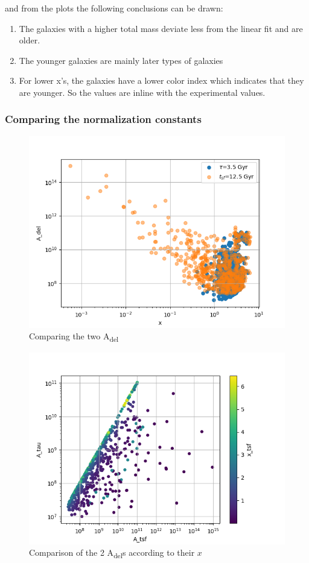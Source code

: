 \documentclass[a4paper,twocolumn]{article}
\begin{document}
and from the plots the following conclusions can be drawn:

\begin{enumerate}
\item The galaxies with a higher total mass deviate less from the linear fit and are older.
\item The younger galaxies are mainly later types of galaxies
\item For lower x's, the galaxies have a lower color index which indicates that they are younger. So the values are inline with the experimental values.
\end{enumerate}

\subsubsection{Comparing the normalization constants}
\label{sec:org5474350}

\begin{figure}[!htpb]
\centering
\includegraphics[width=.9\linewidth]{./figs/Comparing_the_A_x.png}
\caption{\label{fig:Comparing the two A_{del}}Comparing the two A\textsubscript{del}}
\end{figure}


\begin{figure}[!htpb]
\centering
\includegraphics[width=.9\linewidth]{./figs/A_tau-A_tsf_colo_X.png}
\caption{\label{fig:Comparison of the 2 A_{del}s according to their $x$}Comparison of the 2 A\textsubscript{del}s according to their \(x\)}
\end{figure}
\end{document}
